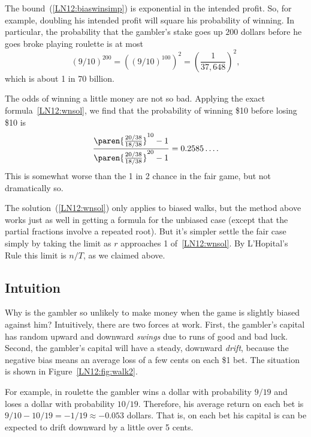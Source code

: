 The bound~(\ref{LN12:biaswinsimp}) is exponential in the intended profit.  So,
for example, doubling his intended profit will square his probability of
winning.  In particular, the probability that the gambler's stake goes up
$200$ dollars before he goes broke playing roulette is at most
\[
(9/10)^{200} = ((9/10)^{100})^2 = \left(\frac{1}{37,648}\right)^2,
\]
which is about 1 in 70 billion.

\begin{editingnotes}

The odds of winning a little money are not so bad.
Applying the exact formula~\eqref{LN12:wnsol}, we find that the probability
of winning \$10 before losing \$10 is
\[
\frac{\paren{\frac{20/38}{18/38}}^{10} - 1}
              {\paren{\frac{20/38}{18/38}}^{20} - 1}
  = 0.2585\dots.
\]
This is somewhat worse than the 1 in 2 chance in the fair game, but not
dramatically so.

\end{editingnotes}

The solution~(\ref{LN12:wnsol}) only applies to biased walks, but the method
above works just as well in getting a formula for the unbiased case
(except that the partial fractions involve a repeated root).  But it's
simpler settle the fair case simply by taking the limit as $r$
approaches 1 of~\eqref{LN12:wnsol}.  By L'Hopital's Rule this limit is $n/T$,
as we claimed above.

\subsection{Intuition}

Why is the gambler so unlikely to make money when the game is slightly
biased against him?  Intuitively, there are two forces at work.  First,
the gambler's capital has random upward and downward {\em swings} due to
runs of good and bad luck.  Second, the gambler's capital will have a
steady, downward {\em drift}, because the negative bias means an average
loss of a few cents on each \$1 bet.  The situation is shown in
Figure~\ref{LN12:fig:walk2}.

\begin{editingnotes}

For example, in roulette the gambler wins a dollar with probability $9/19$
and loses a dollar with probability $10/19$.  Therefore, his average
return on each bet is $9/10 - 10/19 = - 1/19 \approx -0.053$ dollars.
That is, on each bet his capital is can be expected to drift downward by a
little over 5 cents.

\end{editingnotes}

